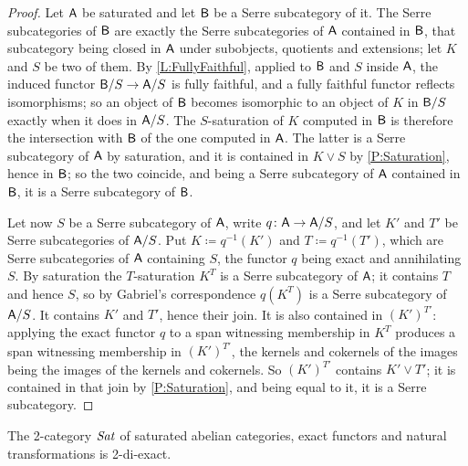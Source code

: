 \begin{proof}
  Let \(\mathsf{A}\) be saturated and let \(\mathsf{B}\) be a Serre subcategory of it. The Serre subcategories of \(\mathsf{B}\) are exactly the Serre subcategories of \(\mathsf{A}\) contained in \(\mathsf{B}\), that subcategory being closed in \(\mathsf{A}\) under subobjects, quotients and extensions; let \(K\) and \(S\) be two of them. By \lemx\ref{L:FullyFaithful}, applied to \(\mathsf{B}\) and \(S\) inside \(\mathsf{A}\), the induced functor \(\mathsf{B}/S\to\mathsf{A}/S\) is fully faithful, and a fully faithful functor reflects isomorphisms; so an object of \(\mathsf{B}\) becomes isomorphic to an object of \(K\) in \(\mathsf{B}/S\) exactly when it does in \(\mathsf{A}/S\). The \(S\)-saturation of \(K\) computed in \(\mathsf{B}\) is therefore the intersection with \(\mathsf{B}\) of the one computed in \(\mathsf{A}\). The latter is a Serre subcategory of \(\mathsf{A}\) by saturation, and it is contained in \(K\vee S\) by \prox\ref{P:Saturation}, hence in \(\mathsf{B}\); so the two coincide, and being a Serre subcategory of \(\mathsf{A}\) contained in \(\mathsf{B}\), it is a Serre subcategory of \(\mathsf{B}\).

	Let now \(S\) be a Serre subcategory of \(\mathsf{A}\), write \(q\colon\mathsf{A}\to\mathsf{A}/S\), and let \(K'\) and \(T'\) be Serre subcategories of \(\mathsf{A}/S\). Put \(K\coloneq q^{-1}(K')\) and \(T\coloneq q^{-1}(T')\), which are Serre subcategories of \(\mathsf{A}\) containing \(S\), the functor \(q\) being exact and annihilating \(S\). By saturation the \(T\)-saturation \(K^{T}\) is a Serre subcategory of \(\mathsf{A}\); it contains \(T\) and hence \(S\), so by Gabriel's correspondence \(q(K^{T})\) is a Serre subcategory of \(\mathsf{A}/S\). It contains \(K'\) and \(T'\), hence their join. It is also contained in \((K')^{T'}\): applying the exact functor \(q\) to a span witnessing membership in \(K^{T}\) produces a span witnessing membership in \((K')^{T'}\), the kernels and cokernels of the images being the images of the kernels and cokernels. So \((K')^{T'}\) contains \(K'\vee T'\); it is contained in that join by \prox\ref{P:Saturation}, and being equal to it, it is a Serre subcategory.
\end{proof}

\begin{theorem}
  \label{T:SatModel} 
  The 2-category \(\mathit{Sat}\) of saturated abelian categories, exact functors and natural transformations is 2-di-exact.
\end{theorem}

